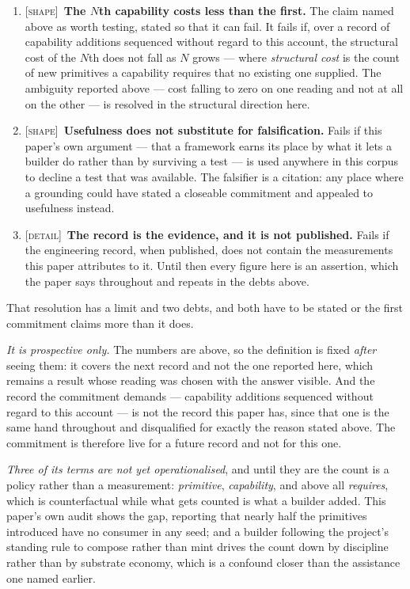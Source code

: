 \documentclass[11pt,a4paper]{article}
\begin{document}
\begin{enumerate}[leftmargin=*]
\item \textsc{[shape]}~\textbf{The $N$th capability costs less than the first.} The claim named above
as worth testing, stated so that it can fail. It fails if, over a record of capability additions
sequenced without regard to this account, the structural cost of the $N$th does not fall as $N$ grows
--- where \emph{structural cost} is the count of new primitives a capability requires that no existing
one supplied. The ambiguity reported above --- cost falling to zero on one reading and not at all on
the other --- is resolved in the structural direction here.
\item \textsc{[shape]}~\textbf{Usefulness does not substitute for falsification.} Fails if this
paper's own argument --- that a framework earns its place by what it lets a builder do rather than by
surviving a test --- is used anywhere in this corpus to decline a test that was available. The
falsifier is a citation: any place where a grounding could have stated a closeable commitment and
appealed to usefulness instead.
\item \textsc{[detail]}~\textbf{The record is the evidence, and it is not published.} Fails if the
engineering record, when published, does not contain the measurements this paper attributes to it. Until
then every figure here is an assertion, which the paper says throughout and repeats in the debts above.
\end{enumerate}

\noindent That resolution has a limit and two debts, and both have to be stated or the first
commitment claims more than it does.

\emph{It is prospective only.} The numbers are above, so the definition is fixed \emph{after} seeing
them: it covers the next record and not the one reported here, which remains a result whose reading
was chosen with the answer visible. And the record the commitment demands --- capability additions
sequenced without regard to this account --- is not the record this paper has, since that one is the
same hand throughout and disqualified for exactly the reason stated above. The commitment is
therefore live for a future record and not for this one.

\emph{Three of its terms are not yet operationalised}, and until they are the count is a policy rather
than a measurement: \emph{primitive}, \emph{capability}, and above all \emph{requires}, which is
counterfactual while what gets counted is what a builder added. This paper's own audit shows the gap,
reporting that nearly half the primitives introduced have no consumer in any seed; and a builder
following the project's standing rule to compose rather than mint drives the count down by discipline
rather than by substrate economy, which is a confound closer than the assistance one named earlier.
\end{document}
